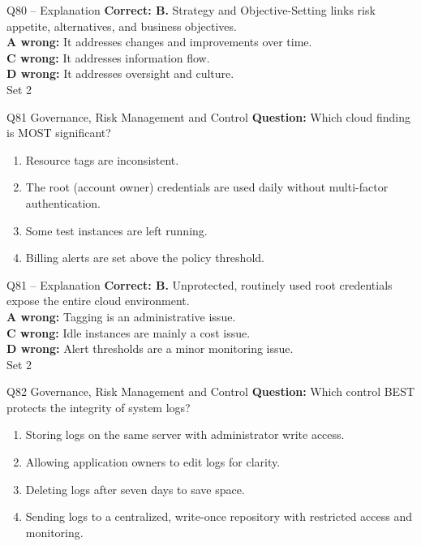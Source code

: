 \documentclass[aspectratio=169,10pt]{beamer}
\begin{document}
\begin{frame}[t]{Q80 -- Explanation}
	\footnotesize
	\textbf{Correct: B.} Strategy and Objective-Setting links risk appetite, alternatives, and business objectives. \\[5pt]
\textbf{A wrong:} It addresses changes and improvements over time. \\[3pt]
\textbf{C wrong:} It addresses information flow. \\[3pt]
\textbf{D wrong:} It addresses oversight and culture. \\[3pt]
	\vfill {\tiny Set 2}
\end{frame}

\begin{frame}[t]{Q81 \hfill {\scriptsize Governance, Risk Management and Control}}
	\small
	\textbf{Question:} Which cloud finding is MOST significant?
	\begin{enumerate}[label=\Alph*.,itemsep=1pt,topsep=3pt]
			\item Resource tags are inconsistent.
			\item The root (account owner) credentials are used daily without multi-factor authentication.
			\item Some test instances are left running.
			\item Billing alerts are set above the policy threshold.
	\end{enumerate}
\end{frame}

\begin{frame}[t]{Q81 -- Explanation}
	\footnotesize
	\textbf{Correct: B.} Unprotected, routinely used root credentials expose the entire cloud environment. \\[5pt]
\textbf{A wrong:} Tagging is an administrative issue. \\[3pt]
\textbf{C wrong:} Idle instances are mainly a cost issue. \\[3pt]
\textbf{D wrong:} Alert thresholds are a minor monitoring issue. \\[3pt]
	\vfill {\tiny Set 2}
\end{frame}

\begin{frame}[t]{Q82 \hfill {\scriptsize Governance, Risk Management and Control}}
	\small
	\textbf{Question:} Which control BEST protects the integrity of system logs?
	\begin{enumerate}[label=\Alph*.,itemsep=1pt,topsep=3pt]
			\item Storing logs on the same server with administrator write access.
			\item Allowing application owners to edit logs for clarity.
			\item Deleting logs after seven days to save space.
			\item Sending logs to a centralized, write-once repository with restricted access and monitoring.
	\end{enumerate}
\end{frame}
\end{document}

